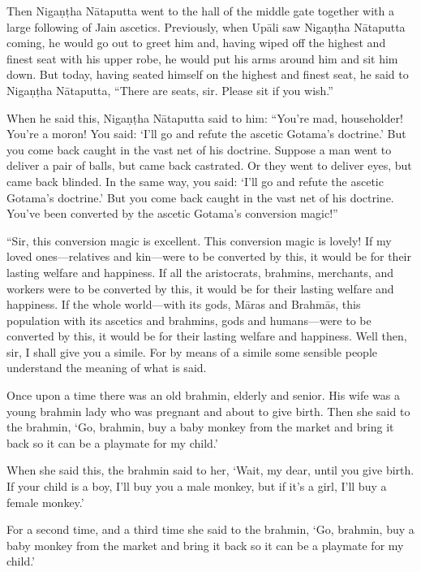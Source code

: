 \documentclass[12pt,openany]{book}%
\begin{document}
Then \textsanskrit{Nigaṇṭha} \textsanskrit{Nātaputta} went to the hall of the middle gate together with a large following of Jain ascetics. Previously, when \textsanskrit{Upāli} saw \textsanskrit{Nigaṇṭha} \textsanskrit{Nātaputta} coming, he would go out to greet him and, having wiped off the highest and finest seat with his upper robe, he would put his arms around him and sit him down. But today, having seated himself on the highest and finest seat, he said to \textsanskrit{Nigaṇṭha} \textsanskrit{Nātaputta}, “There are seats, sir. Please sit if you wish.” 

When he said this, \textsanskrit{Nigaṇṭha} \textsanskrit{Nātaputta} said to him: “You’re mad, householder! You’re a moron! You said: ‘I’ll go and refute the ascetic Gotama’s doctrine.’ But you come back caught in the vast net of his doctrine. Suppose a man went to deliver a pair of balls, but came back castrated. Or they went to deliver eyes, but came back blinded. In the same way, you said: ‘I’ll go and refute the ascetic Gotama’s doctrine.’ But you come back caught in the vast net of his doctrine. You’ve been converted by the ascetic Gotama’s conversion magic!” 

“Sir, this conversion magic is excellent. This conversion magic is lovely! If my loved ones—relatives and kin—were to be converted by this, it would be for their lasting welfare and happiness. If all the aristocrats, brahmins, merchants, and workers were to be converted by this, it would be for their lasting welfare and happiness. If the whole world—with its gods, \textsanskrit{Māras} and \textsanskrit{Brahmās}, this population with its ascetics and brahmins, gods and humans—were to be converted by this, it would be for their lasting welfare and happiness. Well then, sir, I shall give you a simile. For by means of a simile some sensible people understand the meaning of what is said. 

Once upon a time there was an old brahmin, elderly and senior. His wife was a young brahmin lady who was pregnant and about to give birth. Then she said to the brahmin, ‘Go, brahmin, buy a baby monkey from the market and bring it back so it can be a playmate for my child.’ 

When she said this, the brahmin said to her, ‘Wait, my dear, until you give birth. If your child is a boy, I’ll buy you a male monkey, but if it’s a girl, I’ll buy a female monkey.’ 

For a second time, and a third time she said to the brahmin, ‘Go, brahmin, buy a baby monkey from the market and bring it back so it can be a playmate for my child.’ 
\end{document}
